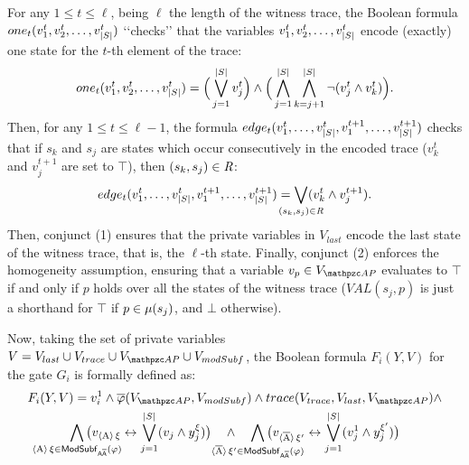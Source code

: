 For any $1 \leq t \leq \ell$, being $\ell$ the length of 
the witness trace, the Boolean formula $one_t(v_1^t, v_2^t, \ldots, v_{|S|}^t)$ \lq\lq checks\rq\rq{} that the variables  $v_1^t, v_2^t, \ldots, v_{|S|}^t$ encode (exactly) one state for the $t$-th element of the trace:
\[one_t(v_1^t, v_2^t, \ldots, v_{|S|}^t)=\Big(\bigvee_{j=1}^{|S|}v_j^t\Big) \wedge\Big(\bigwedge_{j=1}^{|S|}\bigwedge_{k=j+1}^{|S|}\neg(v_j^t \wedge v_k^t)\Big).\]
Then, for any $1 \leq t \leq \ell -1$, the formula $edge_t(v_1^t, \ldots ,v_{|S|}^t,v_1^{t+1}, \ldots ,v_{|S|}^{t+1})$ checks that
if $s_k$ and $s_j$ are states which occur consecutively in the encoded trace ($v_k^t$ and $v_j^{t+1}$ are set to $\top$), then 
$(s_k,s_j)\in\textit{R}$:
\[edge_t(v_1^t, \ldots ,v_{|\States|}^t,v_1^{t+1}, \ldots ,v_{|\States|}^{t+1})=\smashoperator{\bigvee_{(s_k,s_j)\in\Edges}} (v_k^t \wedge v_j^{t+1}).\] 
Then, conjunct (1) ensures that the private variables in $V_{last}$ encode the last state of the witness trace, that is, the $\ell$-th state.
%
Finally, conjunct (2) enforces the homogeneity assumption, ensuring that a variable $v_p \in V_{\Prop}$ evaluates to $\top$ if and only if $p$ holds over all the states of the witness trace ($VAL(s_j,p)$ is just a shorthand for $\top$ if $p\in\mu(s_j)$, and $\bot$ otherwise).


Now, taking the set of private variables $V= V_{last} \cup V_{trace} \cup V_{\Prop} \cup V_{modSubf}$, the Boolean formula $F_i(Y,V)$ for the gate $G_i$ is formally defined as:
\begin{multline*}
F_i(Y,V)=%
v_i^1 \wedge 
\overline{\varphi}(V_{\Prop},V_{modSubf}) \wedge
trace(V_{trace},V_{last},V_{\Prop}) \wedge 
\\
\smashoperator{\bigwedge_{\hsA\xi\in\mods(\varphi)}}\big(v_{\hsA\xi}\leftrightarrow \bigvee_{j=1}^{|\States|} (v_j \wedge y_j^\xi)\big) \quad \wedge \quad \smashoperator{\bigwedge_{\hsAt\xi'\in\mods(\varphi)}}\big(v_{\hsAt\xi'}\leftrightarrow \bigvee_{j=1}^{|\States|} (v_j^1 \wedge y_j^{\xi'})\big)
\end{multline*}
 
